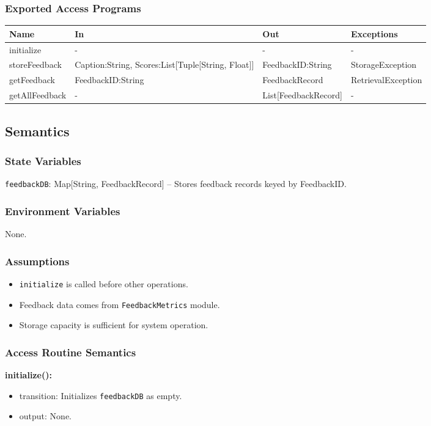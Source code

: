 \documentclass[12pt, titlepage]{article}
\begin{document}
\subsubsection{Exported Access Programs}
\begin{center}
  \begin{tabular}{p{3cm} p{4cm} p{4cm} p{3cm}}
    \hline
    \textbf{Name} & \textbf{In} & \textbf{Out} & \textbf{Exceptions} \\
    \hline
    initialize & - & - & - \\
    \hline
    storeFeedback & Caption:String, Scores:List[Tuple[String, Float]] & FeedbackID:String & StorageException \\
    \hline
    getFeedback & FeedbackID:String & FeedbackRecord & RetrievalException \\
    \hline
    getAllFeedback & - & List[FeedbackRecord] & - \\
    \hline
  \end{tabular}
\end{center}

\subsection{Semantics}

\subsubsection{State Variables}
\texttt{feedbackDB}: Map[String, FeedbackRecord] -- Stores feedback records keyed by FeedbackID.

\subsubsection{Environment Variables}
None.

\subsubsection{Assumptions}
\begin{itemize}
  \item \texttt{initialize} is called before other operations.
  \item Feedback data comes from \texttt{FeedbackMetrics} module.
  \item Storage capacity is sufficient for system operation.
\end{itemize}

\subsubsection{Access Routine Semantics}
\noindent \textbf{initialize():}
\begin{itemize}
  \item transition: Initializes \texttt{feedbackDB} as empty.
  \item output: None.
\end{itemize}
\end{document}
